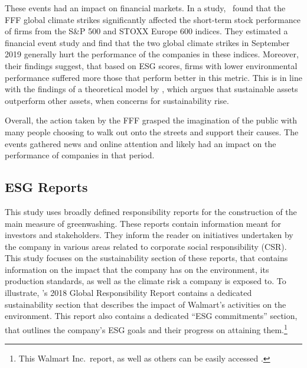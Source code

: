 \documentclass[12pt]{article}
\begin{document}
These events had an impact on financial markets. In a \citeyear{schusterStockPriceReactions2023} study,~\citeauthor{schusterStockPriceReactions2023} found that the FFF global climate strikes significantly affected the short-term stock performance of firms from the S\&P 500 and STOXX Europe 600 indices. They estimated a financial event study and find that the two global climate strikes in September 2019 generally hurt the performance of the companies in these indices. Moreover, their findings suggest, that based on ESG scores, firms with lower environmental performance suffered more those that perform better in this metric.  This is in line with the findings of a theoretical model by \textcite{pastorSustainableInvestingEquilibrium2021}, which argues that sustainable assets outperform other assets, when concerns for sustainability rise.

Overall, the action taken by the FFF grasped the imagination of the public with many people choosing to walk out onto the streets and support their causes. The events gathered news and online attention and likely had an impact on the performance of companies in that period.


\subsection{ESG Reports}


This study uses broadly defined responsibility reports for the construction of the main measure of greenwashing. These reports contain information meant for investors and stakeholders. They inform the reader on initiatives undertaken by the company in various areas related to corporate social responsibility (CSR). This study focuses on the sustainability section of these reports, that contains information on the impact that the company has on the environment, its production standards, as well as the climate risk a company is exposed to. To illustrate, \citeauthor{walmart2018csr}'s 2018 Global Responsibility Report contains a dedicated sustainability section that describes the impact of Walmart's activities on the environment. This report also contains a dedicated ``ESG commitments'' section, that outlines the company's ESG goals and their progress on attaining them.\footnote{This Walmart Inc.~report, as well as others can be easily accessed \href{https://www.responsibilityreports.com/Company/walmart-inc}{}.}
\end{document}
